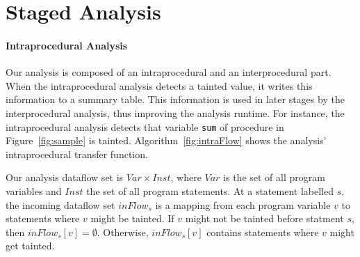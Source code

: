 \section{Staged Analysis}\label{stagedAnalysis}

\newcommand{\varset}{\mathit{Var}}
\newcommand{\instset}{\mathit{Inst}}
\newcommand{\myinflow}{\mathit{inFlow}}
\newcommand{\ifff}{\mathit{iff}}
\newcommand{\aand}{\mathit{and}}

\paragraph{Intraprocedural Analysis}

Our analysis is composed of an intraprocedural and an interprocedural
part. When the intraprocedural analysis detects a tainted value, it
writes this information to a summary table. This information is 
used in later stages by the interprocedural analysis, thus improving
the analysis runtime. 
For instance, the intraprocedural analysis detects that variable
\texttt{sum} of procedure \compute{} in Figure~\ref{fig:sample} is tainted.
Algorithm~\ref{fig:intraFlow} shows the analysis' intraprocedural
transfer function. 

Our analysis dataflow set is $\varset \times \instset$,
where $\varset$ is the set of all program variables and
$\instset$ the set of all program statements. 
At a statement labelled $s$, the incoming dataflow set $\myinflow_s$
is a mapping from each program variable $v$ to
statements where $v$ might be tainted. If $v$ might not
be tainted before statment $s$, then $\myinflow_s[v] = \emptyset$.
Otherwise, $\myinflow_s[v]$ contains statements where $v$
might get tainted.

